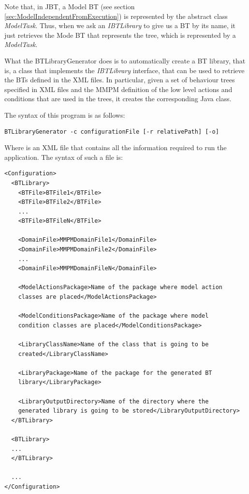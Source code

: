 \documentclass[a4paper]{article}
\begin{document}
Note that, in JBT, a Model BT (see section \ref{sec:ModelIndependentFromExecution}) is represented by the abstract class \textit{ModelTask}. Thus, when we ask an \textit{IBTLibrary} to give us a BT by its name, it just retrieves the Mode BT that represents the tree, which is represented by a \textit{ModelTask}.

What the BTLibraryGenerator does is to automatically create a BT library, that is, a class that implements the \textit{IBTLibrary} interface, that can be used to retrieve the BTs defined in the XML files. In particular, given a set of behaviour trees specified in XML files and the MMPM definition of the low level actions and conditions that are used in the trees, it creates the corresponding Java class.

The syntax of this program is as follows:

\begin{verbatim}
BTLibraryGenerator -c configurationFile [-r relativePath] [-o] 
\end{verbatim}

Where \verb@configurationFile@ is an XML file that contains all the information required to run the application. The syntax of such a file is:

\begin{verbatim}
<Configuration>
  <BTLibrary>
    <BTFile>BTFile1</BTFile>
    <BTFile>BTFile2</BTFile>
    ...
    <BTFile>BTFileN</BTFile>    
 
    <DomainFile>MMPMDomainFile1</DomainFile>
    <DomainFile>MMPMDomainFile2</DomainFile>
    ...
    <DomainFile>MMPMDomainFileN</DomainFile>
  
    <ModelActionsPackage>Name of the package where model action 
    classes are placed</ModelActionsPackage>
  
    <ModelConditionsPackage>Name of the package where model 
    condition classes are placed</ModelConditionsPackage>
  
    <LibraryClassName>Name of the class that is going to be 
    created</LibraryClassName>
  
    <LibraryPackage>Name of the package for the generated BT 
    library</LibraryPackage>
    
    <LibraryOutputDirectory>Name of the directory where the 
    generated library is going to be stored</LibraryOutputDirectory>
  </BTLibrary>
  
  <BTLibrary>
  ...
  </BTLibrary>

  ...
</Configuration>
\end{verbatim}
\end{document}

